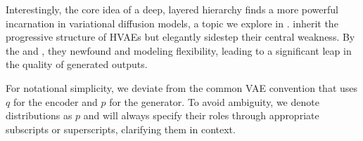 Interestingly, the core idea of a deep, layered hierarchy finds a more powerful incarnation in variational diffusion models, a topic we explore in .  inherit the progressive structure of HVAEs but elegantly sidestep their central weakness. By  the  and , they  newfound  and modeling flexibility, leading to a significant leap in the quality of generated outputs.

For notational simplicity, we deviate from the common VAE convention that uses $q$ for the encoder and $p$ for the generator. To avoid ambiguity, we denote distributions as 
$p$ and will always specify their roles through appropriate subscripts or superscripts, clarifying them in context.









